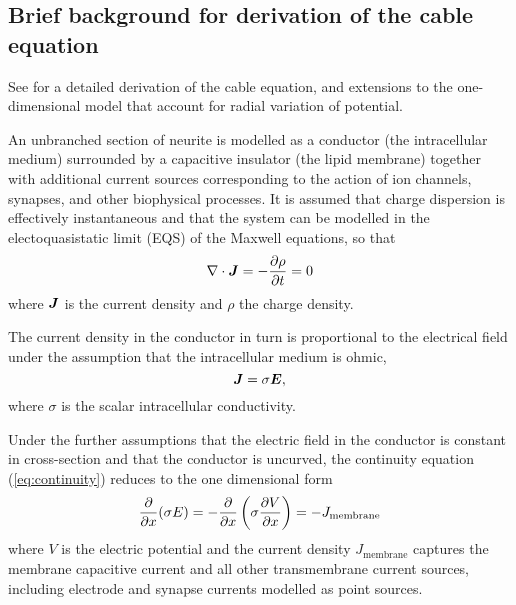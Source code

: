 \subsection{Brief background for derivation of the cable equation}

See \cite{lindsay_2004} for a detailed derivation of the cable equation, and
extensions to the one-dimensional model that account for radial variation of
potential.

An unbranched section of neurite is modelled as a conductor (the intracellular
medium) surrounded by a capacitive insulator (the lipid membrane) together with
additional current sources corresponding to the action of ion channels,
synapses, and other biophysical processes. It is assumed that charge dispersion
is effectively instantaneous and that the system can be modelled in the
electoquasistatic limit (EQS) of the Maxwell equations, so that
\begin{equation}
    \label{eq:continuity}
    \nabla\cdot\bm{J} = -\frac{\partial{\rho}}{\partial{t}} = 0
\end{equation}
where $\bm{J}$ is the current density and $\rho$ the charge density.

The current density in the conductor in turn is proportional to the electrical
field under the assumption that the intracellular medium is ohmic,
\begin{equation}
    \bm{J} = \sigma \bm{E},
\end{equation}
where $\sigma$ is the scalar intracellular conductivity.

Under the further assumptions that the electric field in the conductor is
constant in cross-section and that the conductor is uncurved, the continuity
equation (\ref{eq:continuity}) reduces to the one dimensional form
\begin{equation}
    \frac{\partial{}}{\partial{x}}(\sigma E) = -\frac{\partial{}}{\partial{x}}\left(\sigma\frac{\partial{V}}{\partial{x}}\right) = -J_\text{membrane}
\end{equation}
where $V$ is the electric potential and the current density $J_\text{membrane}$
captures the membrane capacitive current and all other transmembrane current
sources, including electrode and synapse currents modelled as point sources.

